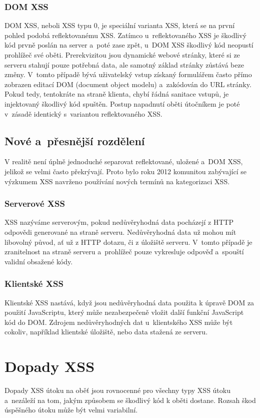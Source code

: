 \documentclass[11pt, conference, a4paper]{IEEEtran}
\begin{document}
\subsubsection{DOM XSS}
DOM XSS, neboli XSS typu 0, je speciální varianta XSS, která se na první pohled podobá reflektovanému XSS. Zatímco u~reflektovaného XSS je škodlivý kód prvně poslán na server a~poté zase zpět, u~DOM XSS škodlivý kód neopustí prohlížeč své oběti. Prerekvizitou jsou dynamické webové stránky, které si ze serveru stahují pouze potřebná data, ale samotný základ stránky zůstává beze změny. V~tomto případě bývá uživatelský vstup získaný formulářem často přímo zobrazen editací DOM (document object modelu) a~zakódován do URL stránky. Pokud tedy, tentokráte na straně klienta, chybí řádná sanitace vstupů, je injektovaný škodlivý kód spuštěn. Postup napadnutí oběti útočníkem je poté v~zásadě identický s~variantou reflektovaného XSS.~\cite{DOM-XSS-owasp}

\subsection{Nové a~přesnější rozdělení}
V realitě není úplně jednoduché separovat reflektované, uložené a~DOM XSS, jelikož se velmi často překrývají. Proto bylo roku 2012 komunitou zabývající se výzkumem XSS navrženo používání nových termínů na kategorizaci XSS.

\subsubsection{Serverové XSS}
XSS nazýváme serverovým, pokud nedůvěryhodná data pocházejí z HTTP odpovědi generované na straně serveru. Nedůvěryhodná data už mohou mít libovolný původ, ať už z HTTP dotazu, či z úložiště serveru. V~tomto případě je zranitelnost na straně serveru a~prohlížeč pouze vykresluje odpověď a~spouští validní obsažené kódy.


\subsubsection{Klientské XSS}
Klientské XSS nastává, když jsou nedůvěryhodná data použita k úpravě DOM za použití JavaScriptu, který může nezabezpečeně vložit další funkční JavaScript kód do DOM. Zdrojem nedůvěryhodných dat u~klientského XSS může být cokoliv, například klientské úložiště, nebo data stažená ze serveru.~\cite{TYPES-XSS-owasp}


\section{Dopady XSS}
Dopady XSS útoku na oběť jsou rovnocenné pro všechny typy XSS útoku a~nezáleží na tom, jakým způsobem se škodlivý kód k oběti dostane. Rozsah škod úspěšného útoku může být velmi variabilní.
\end{document}
